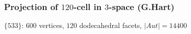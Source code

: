 \documentclass{beamer}
\begin{document}
\begin{frame}\frametitle{Projection of $120$-cell in $3$-space (G.Hart)}
\vspace{-2mm}




\begin{center}
\begin{minipage}{8.5cm}
\centering
{}\par
\end{minipage}
\end{center}
\begin{center}
$\{533\}$: $600$ vertices, $120$ dodecahedral facets, $|Aut|=14400$
\end{center}
\end{frame}
\end{document}
